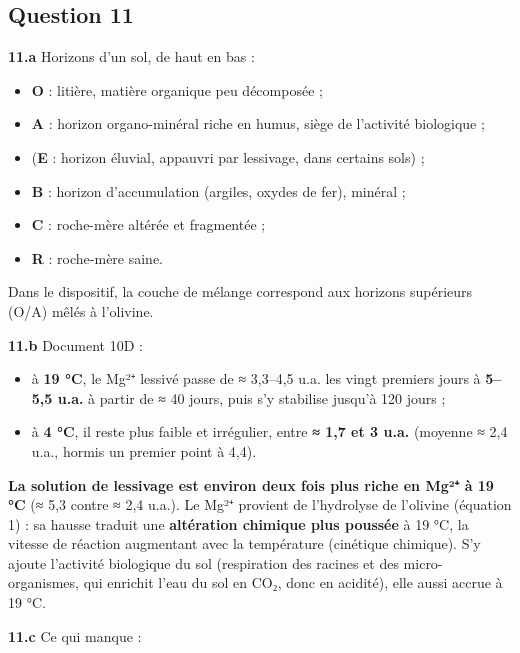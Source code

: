 \documentclass[11pt,a4paper]{article}
\providecommand{\tightlist}{\setlength{\itemsep}{0pt}\setlength{\parskip}{0pt}}
\begin{document}
\hypertarget{question-11}{%
\subsection{Question 11}\label{question-11}}

\textbf{11.a} Horizons d'un sol, de haut en bas :

\begin{itemize}
\tightlist
\item
  \textbf{O} : litière, matière organique peu décomposée ;
\item
  \textbf{A} : horizon organo-minéral riche en humus, siège de l'activité biologique ;
\item
  (\textbf{E} : horizon éluvial, appauvri par lessivage, dans certains sols) ;
\item
  \textbf{B} : horizon d'accumulation (argiles, oxydes de fer), minéral ;
\item
  \textbf{C} : roche-mère altérée et fragmentée ;
\item
  \textbf{R} : roche-mère saine.
\end{itemize}

Dans le dispositif, la couche de mélange correspond aux horizons supérieurs (O/A) mêlés à l'olivine.

\textbf{11.b} Document 10D :

\begin{itemize}
\tightlist
\item
  à \textbf{19 °C}, le Mg²⁺ lessivé passe de ≈ 3,3--4,5 u.a. les vingt premiers jours à \textbf{5--5,5 u.a.} à partir de ≈ 40 jours, puis s'y stabilise jusqu'à 120 jours ;
\item
  à \textbf{4 °C}, il reste plus faible et irrégulier, entre \textbf{≈ 1,7 et 3 u.a.} (moyenne ≈ 2,4 u.a., hormis un premier point à 4,4).
\end{itemize}

\textbf{La solution de lessivage est environ deux fois plus riche en Mg²⁺ à 19 °C} (≈ 5,3 contre ≈ 2,4 u.a.). Le Mg²⁺ provient de l'hydrolyse de l'olivine (équation 1) : sa hausse traduit une \textbf{altération chimique plus poussée} à 19 °C, la vitesse de réaction augmentant avec la température (cinétique chimique). S'y ajoute l'activité biologique du sol (respiration des racines et des micro-organismes, qui enrichit l'eau du sol en CO₂, donc en acidité), elle aussi accrue à 19 °C.

\textbf{11.c} Ce qui manque :
\end{document}

